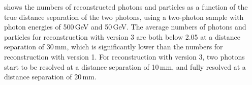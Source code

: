 
 shows the numbers of reconstructed photons and particles as a function of  the true distance separation of the two photons, using a two-photon sample with photon energies of  500\,GeV and 50\,GeV.  The average numbers of photons and particles for reconstruction with \pandora version 3 are both below 2.05 at a distance separation of 30\,mm, which is significantly lower than the numbers for reconstruction with \pandora version 1. For reconstruction with \pandora version 3, two photons start to be resolved at a distance separation of 10\,mm, and fully resolved at a distance separation of 20\,mm.






